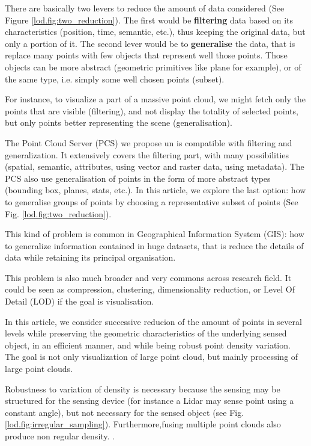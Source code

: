	
	There are basically two levers to reduce the amount of data considered (See Figure \ref{lod.fig:two_reduction}). The first would be \textbf{filtering} data based on its characteristics (position, time, semantic, etc.), thus keeping the original data, but only a portion of it.
	The second lever would be to \textbf{generalise} the data, that is replace many points with few objects that represent  well those points. Those objects can be more abstract (geometric primitives like plane for example), or of the same type, i.e. simply some well chosen points (subset).
	
	For instance, to visualize a part of a massive point cloud, we might fetch only the points that are visible (filtering),
	and not display the totality of selected points, but only points better representing the scene (generalisation).
	
	The Point Cloud Server (PCS) we propose un \cite{Cura2015} is compatible with filtering and generalization. It extensively covers the filtering part, with many possibilities (spatial, semantic, attributes, using vector and raster data, using metadata). The PCS also use generalisation of points in the form of more abstract types (bounding box, planes, stats, etc.).
	In this article, we explore the last option: how to generalise groups of points by choosing a representative subset of points (See Fig. \ref{lod.fig:two_reduction}).
	
	This kind of problem is common in Geographical Information System (GIS): how to generalize information contained in huge datasets, that is reduce the details of data while retaining its principal organisation.
	
	This problem is also much broader and very commons across research field. It could be seen as compression, clustering, dimensionality reduction, or Level Of Detail (LOD) if the goal is visualisation.
	
	In this article, we consider successive reducion of the amount of points in several levels while preserving the geometric characteristics of the underlying sensed object, in an efficient manner, and while being robust point density variation. The goal is not only visualization of large point cloud, but mainly processing of large point clouds.
	
	Robustness to variation of density is necessary because the sensing may be structured for the sensing device (for instance a Lidar may sense point using a constant angle), but not necessary for the sensed object (see Fig. \ref{lod.fig:irregular_sampling}). Furthermore,fusing multiple point clouds also produce non regular density.
	.
	

